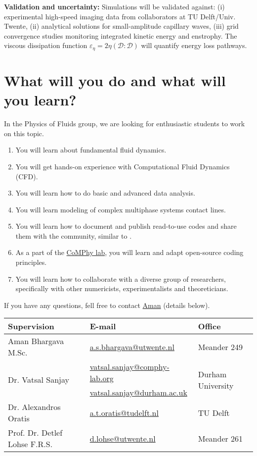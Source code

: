 \documentclass[a4paper,10pt]{article}
\begin{document}
\noindent \textbf{Validation and uncertainty:} Simulations will be validated against: (i) experimental high-speed imaging data from collaborators at TU Delft/Univ. Twente, (ii) analytical solutions for small-amplitude capillary waves, (iii) grid convergence studies monitoring integrated kinetic energy and enstrophy. The viscous dissipation function $\varepsilon_\eta = 2\eta\left(\boldsymbol{\mathcal{D}:\mathcal{D}}\right)$ will quantify energy loss pathways.

\section*{What will you do and what will you learn?}
In the Physics of Fluids group, we are looking for enthusiastic students to work on this topic.
\begin{enumerate}
\itemsep0em
\item You will learn about fundamental fluid dynamics.
\item You will get hands-on experience with Computational Fluid Dynamics (CFD).
\item You will learn how to do basic and advanced data analysis.
\item You will learn modeling of complex multiphase systems contact lines. 
\item You will learn how to document and publish read-to-use codes and share them with the community, similar to \citet{basiliskVatsal, basiliskVatsalDropFilm, basiliskVatsalViscousBouncing}. 
\item As a part of the \href{https://comphy-lab.org}{CoMPhy lab}, you will learn and adapt open-source coding principles. 
\item You will learn how to collaborate with a diverse group of researchers, specifically with other numericists, experimentalists and theoreticians.
\end{enumerate}

If you have any questions, fell free to contact \href{mailto:a.s.bhargava@utwente.nl}{Aman} (details below).
\begin{center}
\begin{tabular}{|l|l|l|}
\hline \textbf{Supervision} & \textbf{E-mail} & \textbf{Office} \\
\hline Aman Bhargava M.Sc. & \href{mailto:a.s.bhargava@utwente.nl}{a.s.bhargava@utwente.nl} & Meander 249 \\
\hline \multirow{2}{*}{Dr. Vatsal Sanjay} & \href{mailto:vatsal.sanjay@comphy-lab.org}{vatsal.sanjay@comphy-lab.org} & \multirow{2}{*}{Durham University} \\
& \href{mailto:vatsal.sanjay@durham.ac.uk}{vatsal.sanjay@durham.ac.uk} & \\
\hline Dr. Alexandros Oratis   & \href{mailto:a.t.oratis@tudelft.nl}{a.t.oratis@tudelft.nl}& TU Delft \\
\hline Prof. Dr. Detlef Lohse F.R.S. & \href{mailto:d.lohse@utwente.nl}{d.lohse@utwente.nl} & Meander 261  \\
\hline
\end{tabular}
\end{center}

\printbibliography
\end{document}
